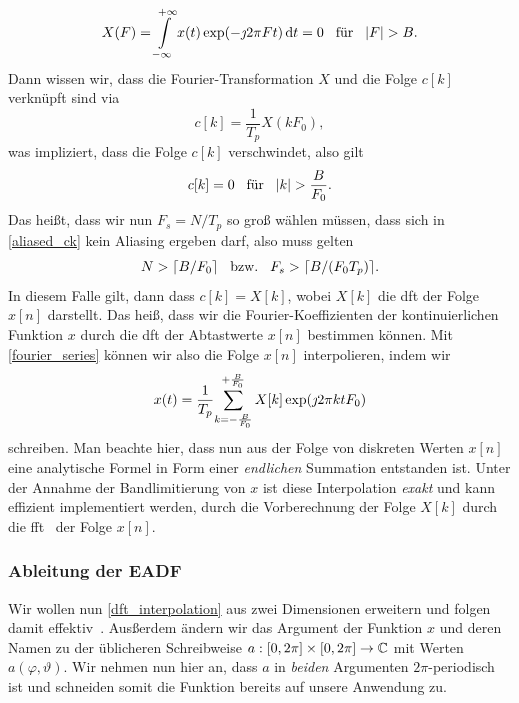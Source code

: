 \begin{equation}
    X(F) = {\int\limits_{-\infty}^{+\infty}{x(t) \exp(-\jmath 2 \pi F t )}\,\mathrm{d}{t}} = 0 {\hspace{3mm} \text{f\"ur} \hspace{3mm}} {\left| F \right|} > B.
\end{equation}
Dann wissen wir, dass die Fourier-Transformation $X$ und die Folge $c[k]$ verkn\"upft sind via 
\begin{equation}
    c[k] = \frac{1}{T_p} X(k F_0),
\end{equation}
was impliziert, dass die Folge $c[k]$ verschwindet, also gilt
\begin{equation}
    c[k] = 0 {\hspace{3mm} \text{f\"ur} \hspace{3mm}} {\left| k \right|} > \frac{B}{F_0}.
\end{equation}
Das hei{\ss}t, dass wir nun $F_s = N/T_p$ so gro{\ss} w\"ahlen m\"ussen, dass sich in \eqref{aliased_ck} kein Aliasing ergeben darf, also muss gelten
\begin{equation}
    N > \lceil B/F_0 \rceil {\hspace{3mm} \text{bzw.} \hspace{3mm}} F_s > \lceil B/(F_0 T_p) \rceil.
\end{equation}
In diesem Falle gilt, dann dass $c[k] = X[k]$, wobei $X[k]$ die \gls{dft} der Folge $x[n]$ darstellt. Das hei{\ss}, dass wir die Fourier-Koeffizienten der kontinuierlichen Funktion $x$ durch die \gls{dft} der Abtastwerte $x[n]$ bestimmen k\"onnen. Mit \eqref{fourier_series} k\"onnen wir also die Folge $x[n]$ interpolieren, indem wir
\begin{equation}\label{dft_interpolation}
    x(t) = \frac{1}{T_p}{\sum\limits_{k=-\frac{B}{F_0}}^{+\frac{B}{F_0}}{
        X[k] \exp(\jmath 2 \pi k t F_0) 
    }}
\end{equation}
schreiben. Man beachte hier, dass nun aus der Folge von diskreten Werten $x[n]$ eine analytische Formel in Form einer \emph{endlichen} Summation entstanden ist. Unter der Annahme der Bandlimitierung von $x$ ist diese Interpolation \emph{exakt} und kann effizient implementiert werden, durch die Vorberechnung der Folge $X[k]$ durch die \gls{fft}~\cite{FFTW05} der Folge $x[n]$. 
%
%
%
%
\subsubsection{Ableitung der EADF}
%
%
Wir wollen nun \eqref{dft_interpolation} aus zwei Dimensionen erweitern und folgen damit effektiv~\cite{landmann2004EADF}.
Aus{\ss}erdem \"andern wir das Argument der Funktion $x$ und deren Namen zu der \"ublicheren Schreibweise $a : [0, 2 \pi] \times [0, 2 \pi] \rightarrow \mathbb{C}$ mit Werten $a(\varphi, \vartheta)$. 
Wir nehmen nun hier an, dass $a$ in \emph{beiden} Argumenten $2\pi$-periodisch ist und schneiden somit die Funktion bereits auf unsere Anwendung zu.

